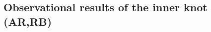 \subsection{Observational results of the inner knot (AR,RB)}
\label{sec:knot}
\cite{Moran_2015}\cite{rudy2015}\cite{Madsen_2015}